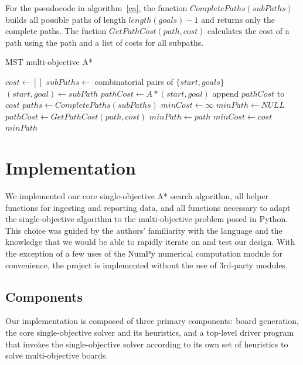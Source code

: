 \documentclass[12pt, conference, compsocconf]{IEEEtran}
\begin{document}
For the pseudocode in algorithm~\ref{ca}, the function
$CompletePaths(subPaths)$ builds all possible paths of length $length(goals)-1$
and returns only the complete paths.  The fuction $GetPathCost(path, cost)$
calculates the cost of a path using the path and a list of costs for all
subpaths.

\begin{algorithm}
    \caption{MST multi-objective A*}
    \label{ca}
    \begin{algorithmic}[1]
        \State $cost \gets []$
        \State $subPaths\gets$ combinatorial pairs of $\{start, goals\}$
            \State $(start, goal) \gets subPath$
            \State $pathCost \gets A*(start, goal)$
            \State append $pathCost$ to $cost$
        \EndFor
        \State $paths\gets CompletePaths(subPaths)$
        \State $minCost \gets \infty$
        \State $minPath \gets NULL$
            \State $pathCost \gets GetPathCost(path, cost)$
                \State $minPath\gets path$
                \State $minCost\gets cost$
            \EndIf
        \EndFor
        \Return $minPath$
        \EndProcedure
    \end{algorithmic}
\end{algorithm}

\section{Implementation}
We implemented our core single-objective A* search algorithm, all helper
functions for ingesting and reporting data, and all functions necessary to
adapt the single-objective algorithm to the multi-objective problem posed in
Python.  This choice was guided by the authors' familiarity with the language
and the knowledge that we would be able to rapidly iterate on and test our
design.  With the exception of a few uses of the NumPy numerical computation
module for convenience, the project is implemented without the use of 3rd-party
modules.

\subsection{Components}
Our implementation is composed of three primary components: board generation,
the core single-objective solver and its heuristics, and a top-level driver
program that invokes the single-objective solver according to its own set of
heuristics to solve multi-objective boards.
\end{document}
